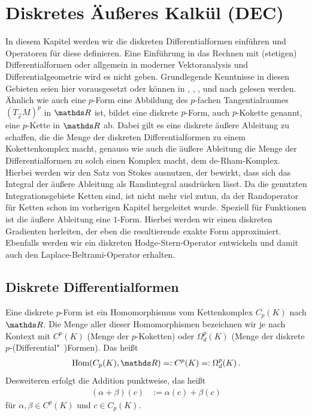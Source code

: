 \chapter{Diskretes Äußeres Kalkül (DEC)}
\label{chapterDEC}

In diesem Kapitel werden wir die diskreten Differentialformen einführen und Operatoren für diese definieren.
Eine Einführung in das Rechnen mit (stetigen) Differentialformen oder allgemein in moderner Vektoranalysis und Differentialgeometrie wird
es nicht geben. 
Grundlegende Kenntnisse in diesen Gebieten seien hier vorausgesetzt oder können in \cite{Marsden}, \cite{berger}, \cite{jaenich},
\cite{Lee} und \cite{FirstCourse} nach gelesen werden.
Ähnlich wie auch eine \( p \)-Form eine Abbildung des \( p \)-fachen Tangentialraumes \( \left( T_{\vec{x}}M \right)^{p} \) in \( \R \)
ist, bildet eine diskrete \( p \)-Form, auch \( p \)-Kokette genannt,  eine \( p \)-Kette in \( \R \) ab.
Dabei gilt es eine diskrete äußere Ableitung zu schaffen, die die Menge der diskreten Differentialformen zu einem Kokettenkomplex macht,
genauso wie auch die äußere Ableitung die Menge der Differentialformen zu solch einen Komplex macht, dem de-Rham-Komplex.
Hierbei werden wir den Satz von Stokes ausnutzen, der bewirkt, dass sich das Integral der äußere Ableitung als Randintegral ausdrücken
lässt. 
Da die genutzten Integrationsgebiete Ketten sind, ist nicht mehr viel zutun, da der Randoperator für Ketten schon im vorherigen Kapitel
hergeleitet wurde.
Speziell für Funktionen ist die äußere Ableitung eine \( 1 \)-Form.
Hierbei werden wir einen diskreten Gradienten herleiten, der eben die resultierende exakte Form approximiert.
Ebenfalls werden wir ein diskreten Hodge-Stern-Operator entwickeln und damit auch den Laplace-Beltrami-Operator erhalten.

                                                                        

\section{Diskrete Differentialformen}
  
  \begin{definition}
    Eine diskrete \( p \)-Form ist ein Homomorphismus vom Kettenkomplex \( C_{p}(K) \) nach \( \R \).
    Die Menge aller dieser Homomorphismen bezeichnen wir je nach Kontext mit \( C^{p}(K) \) (Menge der \( p \)-Koketten)
    oder \( \Omega^{p}_{d}(K) \) (Menge der diskrete \( p \)-(Differential"~)For\-men). 
    Das heißt
    \begin{align}
      \hom(C_{p}(K),\R) =: C^{p}(K) =: \Omega^{p}_{d}(K) \formpunkt
    \end{align}
    Desweiteren erfolgt die Addition punktweise, das heißt
    \begin{align}
      \left( \alpha + \beta \right)(c) &:= \alpha(c) + \beta(c)
    \end{align}
    für \( \alpha,\beta \in C^{p}(K) \) und \( c \in C_{p}(K) \).
  \end{definition}
  
